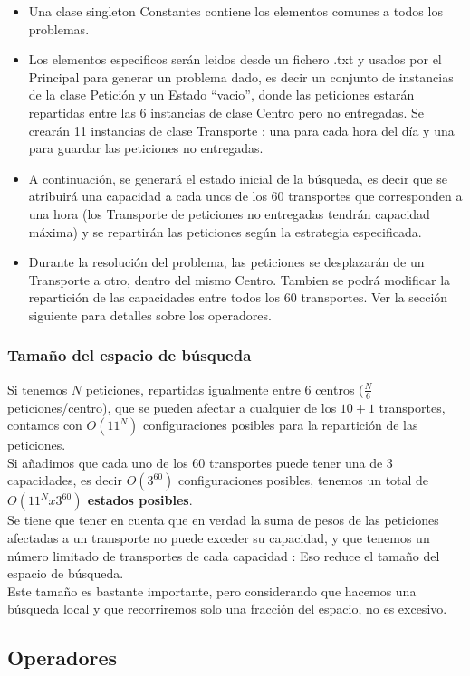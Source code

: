\documentclass{article}
\begin{document}
\begin{itemize}
\item Una clase singleton Constantes contiene los elementos comunes a todos los
problemas.
\item Los elementos especificos serán leidos desde un fichero .txt y usados por
el Principal para generar un problema dado, es decir un conjunto de instancias
de la clase Petición y un Estado ``vacio'', donde las peticiones estarán
repartidas entre las 6 instancias de clase Centro pero no entregadas. Se crearán
11 instancias de clase Transporte : una para cada hora del día y una para
guardar las peticiones no entregadas.
\item A continuación, se generará el estado inicial de la búsqueda, es decir que
se atribuirá una capacidad a cada unos de los 60 transportes que corresponden a
una hora (los Transporte de peticiones no entregadas tendrán capacidad máxima) y
se repartirán las peticiones según la estrategia especificada.
\item Durante la resolución del problema, las peticiones se desplazarán de un
Transporte a otro, dentro del mismo Centro. Tambien se podrá modificar la
repartición de las capacidades entre todos los 60 transportes. Ver la sección
siguiente para detalles sobre los operadores.
\end{itemize}
\subsubsection{Tamaño del espacio de búsqueda}
Si tenemos $N$ peticiones, repartidas igualmente entre 6 centros ($\frac{N}{6}$
peticiones/centro), que se pueden afectar a cualquier de los $10+1$ transportes,
contamos con $O(11^N)$ configuraciones posibles para la repartición de las
peticiones.\\
Si añadimos que cada uno de los 60 transportes puede tener una de 3 capacidades,
es decir $O(3^{60})$ configuraciones posibles, tenemos un total de
\textbf{$O(11^Nx3^{60})$ estados posibles}.\\
\indent Se tiene que tener en cuenta que en verdad la suma de pesos de las
peticiones afectadas a un transporte no puede exceder su capacidad, y que
tenemos un número limitado de transportes de cada capacidad : Eso reduce el
tamaño del espacio de búsqueda.\\
\indent Este tamaño es bastante importante, pero considerando que hacemos una
búsqueda local y que recorriremos solo una fracción del espacio, no es excesivo.

\subsection{Operadores}
\end{document}

